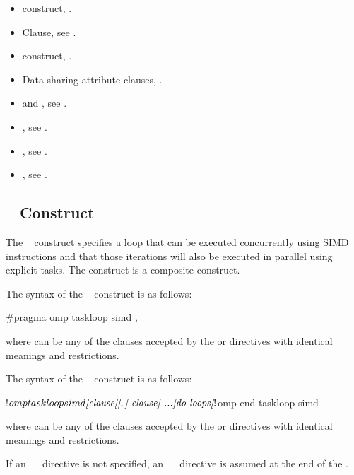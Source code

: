 \crossreferences
\begin{itemize}
\item {} construct, .
\item {} Clause, see .
\item {} construct, .
\item Data-sharing attribute clauses, .
\item {} and , see
  .
\item {}, see .
\item {}, see
.
\item {}, see 
.

\end{itemize}






%
%
\subsection{~ Construct}
\label{subsec:taskloop simd Construct}
\summary
The ~ construct specifies a loop that can be
executed concurrently using SIMD instructions and that those iterations
will also be executed in parallel using explicit tasks. The 
 construct is a composite construct.

\syntax
\begin{ccppspecific}
The syntax of the ~ construct is as follows:
\begin{ompcPragma}
#pragma omp taskloop simd \plc{[clause[[},\plc{] clause] ...] new-line}
\end{ompcPragma}
where  can be any of the clauses accepted by the  or  directives with identical meanings and restrictions.
\end{ccppspecific}
\begin{fortranspecific}
The syntax of the ~ construct is as follows:
\begin{ompfPragma}
!$omp taskloop simd \plc{[clause[[},\plc{] clause] ...]}
    \plc{do-loops}
\plc{[}!$omp end taskloop simd\plc{]}
\end{ompfPragma}
where  can be any of the clauses accepted by the  or  directives with identical meanings and restrictions.

If an ~~ directive is not specified, an ~~ directive is assumed at the end of the .
\end{fortranspecific}

